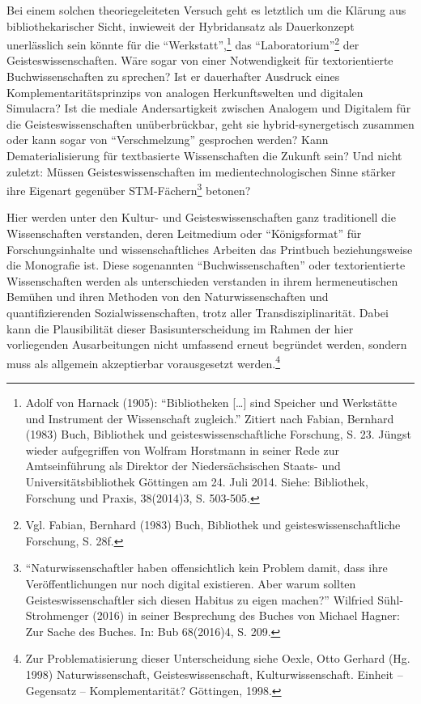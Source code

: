 \documentclass[a4paper,
fontsize=11pt,
oneside,
numbers=noperiodatend,
parskip=half-,
bibliography=totoc,
final
]{scrartcl}
\begin{document}
Bei einem solchen theoriegeleiteten Versuch geht es letztlich um die
Klärung aus bibliothekarischer Sicht, inwieweit der Hybridansatz als
Dauerkonzept unerlässlich sein könnte für die
\enquote{Werkstatt},\footnote{Adolf von Harnack (1905):
  \enquote{Bibliotheken {[}\ldots{}{]} sind Speicher und Werkstätte und
  Instrument der Wissenschaft zugleich.} Zitiert nach Fabian, Bernhard
  (1983) Buch, Bibliothek und geisteswissenschaftliche Forschung, S. 23.
  Jüngst wieder aufgegriffen von Wolfram Horstmann in seiner Rede zur
  Amtseinführung als Direktor der Niedersächsischen Staats- und
  Universitätsbibliothek Göttingen am 24. Juli 2014. Siehe: Bibliothek,
  Forschung und Praxis, 38(2014)3, S. 503-505.} das
\enquote{Laboratorium}\footnote{Vgl. Fabian, Bernhard (1983) Buch,
  Bibliothek und geisteswissenschaftliche Forschung, S. 28f.} der
Geisteswissenschaften. Wäre sogar von einer Notwendigkeit für
textorientierte Buchwissenschaften zu sprechen? Ist er dauerhafter
Ausdruck eines Komplementaritätsprinzips von analogen Herkunftswelten
und digitalen Simulacra? Ist die mediale Andersartigkeit zwischen
Analogem und Digitalem für die Geisteswissenschaften unüberbrückbar,
geht sie hybrid-synergetisch zusammen oder kann sogar von
\enquote{Verschmelzung} gesprochen werden? Kann Dematerialisierung für
textbasierte Wissenschaften die Zukunft sein? Und nicht zuletzt: Müssen
Geisteswissenschaften im medientechnologischen Sinne stärker ihre
Eigenart gegenüber STM-Fächern\footnote{\enquote{Naturwissenschaftler
  haben offensichtlich kein Problem damit, dass ihre Veröffentlichungen
  nur noch digital existieren. Aber warum sollten Geisteswissenschaftler
  sich diesen Habitus zu eigen machen?} Wilfried Sühl-Strohmenger (2016)
  in seiner Besprechung des Buches von Michael Hagner: Zur Sache des
  Buches. In: Bub 68(2016)4, S. 209.} betonen?

Hier werden unter den Kultur- und Geisteswissenschaften ganz
traditionell die Wissenschaften verstanden, deren Leitmedium oder
\enquote{Königsformat} für Forschungsinhalte und wissenschaftliches
Arbeiten das Printbuch beziehungsweise die Monografie ist. Diese
sogenannten \enquote{Buchwissenschaften} oder textorientierte
Wissenschaften werden als unterschieden verstanden in ihrem
hermeneutischen Bemühen und ihren Methoden von den Naturwissenschaften
und quantifizierenden Sozialwissenschaften, trotz aller
Transdisziplinarität. Dabei kann die Plausibilität dieser
Basisunterscheidung im Rahmen der hier vorliegenden Ausarbeitungen nicht
umfassend erneut begründet werden, sondern muss als allgemein
akzeptierbar vorausgesetzt werden.\footnote{Zur Problematisierung dieser
  Unterscheidung siehe Oexle, Otto Gerhard (Hg. 1998) Naturwissenschaft,
  Geisteswissenschaft, Kulturwissenschaft. Einheit -- Gegensatz --
  Komplementarität? Göttingen, 1998.}
\end{document}

